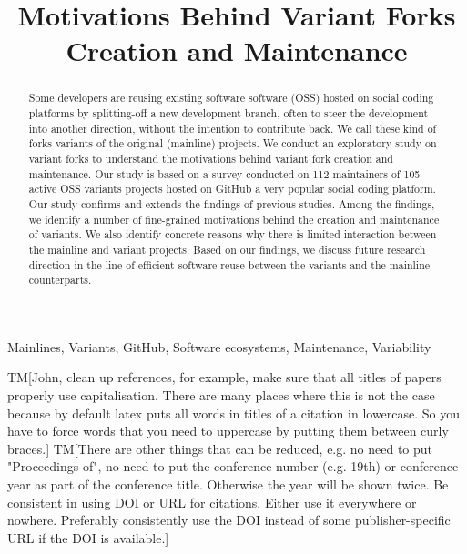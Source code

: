\documentclass[10pt,conference]{IEEEtran}
\newcommand{\tm}[1]{{\color{blue}\textsf{TM}[\smaller\sffamily #1}]}
\begin{document}
\title{Motivations Behind Variant Forks Creation and Maintenance}


\maketitle

\begin{abstract}
Some developers are reusing existing software software (OSS) hosted on social coding platforms by splitting-off a new development branch, often to steer the development into another direction, without the intention to  contribute back. We call these kind of forks variants of the original (mainline) projects.
We conduct an exploratory study on variant forks to understand the motivations behind variant fork creation and maintenance. Our study is based on a survey conducted on 112 maintainers of 105 active OSS variants projects hosted on GitHub a very popular social coding platform. Our study confirms and extends the findings of previous studies. Among the findings, we identify a number of fine-grained motivations behind the creation and maintenance of variants. We also identify concrete reasons why there is limited interaction between the mainline and variant projects. Based on our findings, we discuss future research direction in the line of efficient software reuse between the variants and the mainline counterparts.
\end{abstract}

\begin{IEEEkeywords}
Mainlines, Variants, GitHub, Software ecosystems, Maintenance, Variability
\end{IEEEkeywords}









\newpage
\tm{John, clean up references, for example, make sure that all titles of papers properly use capitalisation. There are many places where this is not the case because by default latex puts all words in titles of a citation in lowercase. So you have to force words that you need to uppercase by putting them between curly braces.}
\tm{There are other things that can be reduced, e.g. no need to put "Proceedings of", no need to put the conference number (e.g. 19th) or conference year as part of the conference title. Otherwise the year will be shown twice. Be consistent in using DOI or URL for citations. Either use it everywhere or nowhere. Preferably consistently use the DOI instead of some publisher-specific URL if the DOI is available.}

\typeout{}

\end{document}
